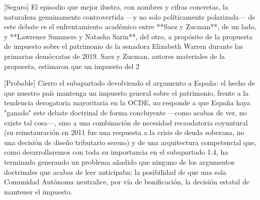 \documentclass[10pt,a4paper]{article}
\begin{document}
[Seguro] El episodio que mejor ilustra, con nombres y cifras concretas, la naturaleza genuinamente controvertida —y no solo políticamente polarizada— de este debate es el enfrentamiento académico entre **Saez y Zucman**, de un lado, y **Lawrence Summers y Natasha Sarin**, del otro, a propósito de la propuesta de impuesto sobre el patrimonio de la senadora Elizabeth Warren durante las primarias demócratas de 2019. Saez y Zucman, autores materiales de la propuesta, estimaron que un impuesto del 2%

[Probable] Cierro el subapartado devolviendo el argumento a España: el hecho de que nuestro país mantenga un impuesto general sobre el patrimonio, frente a la tendencia derogatoria mayoritaria en la OCDE, no responde a que España haya "ganado" este debate doctrinal de forma concluyente —como acabas de ver, no existe tal cosa—, sino a una combinación de necesidad recaudatoria coyuntural (su reinstauración en 2011 fue una respuesta a la crisis de deuda soberana, no una decisión de diseño tributario sereno) y de una arquitectura competencial que, como desarrollaremos con toda su importancia en el subapartado 1.4, ha terminado generando un problema añadido que ninguno de los argumentos doctrinales que acabas de leer anticipaba: la posibilidad de que una sola Comunidad Autónoma neutralice, por vía de bonificación, la decisión estatal de mantener el impuesto.
\end{document}
